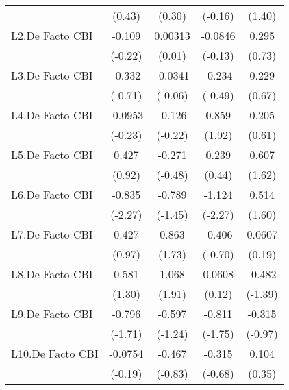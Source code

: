 {\begin{longtable}{l*{4}{c}}
                &   (0.43)         &   (0.30)         &  (-0.16)         &   (1.40)         \\
[1em]
L2.De Facto CBI &   -0.109         &  0.00313         &  -0.0846         &    0.295         \\
                &  (-0.22)         &   (0.01)         &  (-0.13)         &   (0.73)         \\
[1em]
L3.De Facto CBI &   -0.332         &  -0.0341         &   -0.234         &    0.229         \\
                &  (-0.71)         &  (-0.06)         &  (-0.49)         &   (0.67)         \\
[1em]
L4.De Facto CBI &  -0.0953         &   -0.126         &    0.859         &    0.205         \\
                &  (-0.23)         &  (-0.22)         &   (1.92)         &   (0.61)         \\
[1em]
L5.De Facto CBI &    0.427         &   -0.271         &    0.239         &    0.607         \\
                &   (0.92)         &  (-0.48)         &   (0.44)         &   (1.62)         \\
[1em]
L6.De Facto CBI &   -0.835\sym{*}  &   -0.789         &   -1.124\sym{*}  &    0.514         \\
                &  (-2.27)         &  (-1.45)         &  (-2.27)         &   (1.60)         \\
[1em]
L7.De Facto CBI &    0.427         &    0.863         &   -0.406         &   0.0607         \\
                &   (0.97)         &   (1.73)         &  (-0.70)         &   (0.19)         \\
[1em]
L8.De Facto CBI &    0.581         &    1.068         &   0.0608         &   -0.482         \\
                &   (1.30)         &   (1.91)         &   (0.12)         &  (-1.39)         \\
[1em]
L9.De Facto CBI &   -0.796         &   -0.597         &   -0.811         &   -0.315         \\
                &  (-1.71)         &  (-1.24)         &  (-1.75)         &  (-0.97)         \\
[1em]
L10.De Facto CBI&  -0.0754         &   -0.467         &   -0.315         &    0.104         \\
                &  (-0.19)         &  (-0.83)         &  (-0.68)         &   (0.35)         \\

\end{longtable}}
